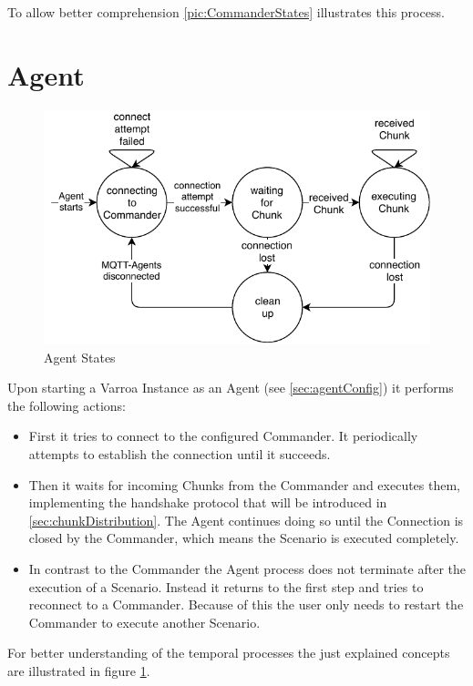To allow better comprehension \figurename{} \ref{pic:CommanderStates} illustrates this process.

\section{Agent}
\begin{figure}[H]
	\begin{center}
	\includegraphics[scale=0.9]{Resources/PDF/AgentStates}
	\caption{Agent States}
	\label{pic:AgentStates}
	\end{center}
\end{figure}
Upon starting a Varroa Instance as an Agent (see \ref{sec:agentConfig}) it performs the following actions:
\begin{itemize}
	\item First it tries to connect to the configured Commander.
	It periodically attempts to establish the connection until it succeeds.
	\item Then it waits for incoming Chunks from the Commander and executes them, implementing the handshake protocol that will be introduced in \ref{sec:chunkDistribution}.
	The Agent continues doing so until the Connection is closed by the Commander, which means the Scenario is executed completely.
	\item In contrast to the Commander the Agent process does not terminate after the execution of a Scenario. Instead it returns to the first step and tries to reconnect to a Commander.
	Because of this the user only needs to restart the Commander to execute another Scenario.
\end{itemize}

For better understanding of the temporal processes the just explained concepts are illustrated in figure \ref{pic:AgentStates}.

